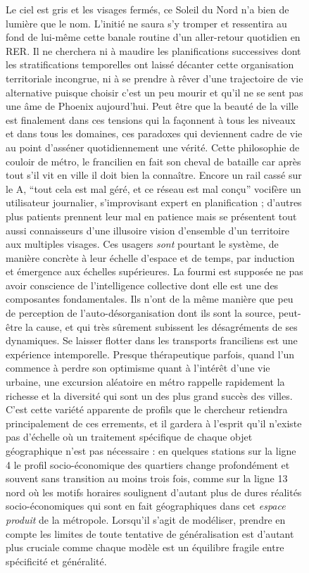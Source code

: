 \begin{figure}[h!]
\begin{mdframed}
Le ciel est gris et les visages fermés, ce Soleil du Nord n'a bien de lumière que le nom. L'initié ne saura s'y tromper et ressentira au fond de lui-même cette banale routine d'un aller-retour quotidien en RER. Il ne cherchera ni à maudire les planifications successives dont les stratifications temporelles ont laissé décanter cette organisation territoriale incongrue, ni à se prendre à rêver d'une trajectoire de vie alternative puisque choisir c'est un peu mourir et qu'il ne se sent pas une âme de Phoenix aujourd'hui. Peut être que la beauté de la ville est finalement dans ces tensions qui la façonnent à tous les niveaux et dans tous les domaines, ces paradoxes qui deviennent cadre de vie au point d'asséner quotidiennement une vérité. Cette philosophie de couloir de métro, le francilien en fait son cheval de bataille car après tout s'il vit en ville il doit bien la connaître. Encore un rail cassé sur le A, ``tout cela est mal géré, et ce réseau est mal conçu'' vocifère un utilisateur journalier, s'improvisant expert en planification ; d'autres plus patients prennent leur mal en patience mais se présentent tout aussi connaisseurs d'une illusoire vision d'ensemble d'un territoire aux multiples visages. Ces usagers \emph{sont} pourtant le système, de manière concrète à leur échelle d'espace et de temps, par induction et émergence aux échelles supérieures. La fourmi est supposée ne pas avoir conscience de l'intelligence collective dont elle est une des composantes fondamentales. Ils n'ont de la même manière que peu de perception de l'auto-désorganisation dont ils sont la source, peut-être la cause, et qui très sûrement subissent les désagréments de ses dynamiques. Se laisser flotter dans les transports franciliens est une expérience intemporelle. Presque thérapeutique parfois, quand l'un commence à perdre son optimisme quant à l'intérêt d'une vie urbaine, une excursion aléatoire en métro rappelle rapidement la richesse et la diversité qui sont un des plus grand succès des villes. C'est cette variété apparente de profils que le chercheur retiendra principalement de ces errements, et il gardera à l'esprit qu'il n'existe pas d'échelle où un traitement spécifique de chaque objet géographique n'est pas nécessaire : en quelques stations sur la ligne 4 le profil socio-économique des quartiers change profondément et souvent sans transition au moins trois fois, comme sur la ligne 13 nord où les motifs horaires soulignent d'autant plus de dures réalités socio-économiques qui sont en fait géographiques dans cet \emph{espace produit} de la métropole. Lorsqu'il s'agit de modéliser, prendre en compte les limites de toute tentative de généralisation est d'autant plus cruciale comme chaque modèle est un équilibre fragile entre spécificité et généralité.


\end{mdframed}
\end{figure}
